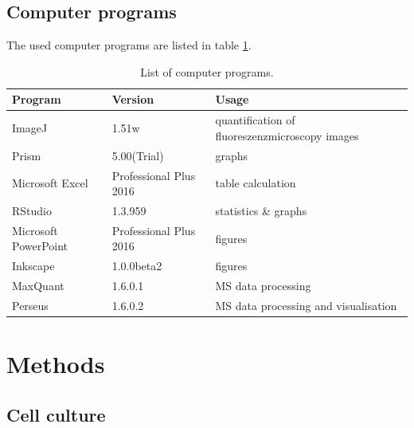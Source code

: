 \documentclass[a4paper,11pt,bibtotocnumbered]{article}
\begin{document}


\newpage
\subsection{Computer programs}

The used computer programs are listed in table \ref{Computerprogramme}.


\begin{table}[H]
\centering
{\captionsetup{format=hang}\caption[List of computer programs.]{List of computer programs.}\label{Computerprogramme}}
\renewcommand{\arraystretch}{1}
\begin{tabularx}{\textwidth}{p{4cm}p{3cm}X}
\toprule
Program&Version&Usage\\
\midrule
\midrule
ImageJ&1.51w&quantification of fluoreszenzmicroscopy images\\
\midrule
Prism&5.00(Trial)&graphs\\
\midrule
Microsoft Excel &Professional Plus 2016& table calculation\\
\midrule
RStudio &1.3.959& statistics \& graphs\\
\midrule
Microsoft PowerPoint&Professional Plus 2016&figures\\
\midrule
Inkscape&1.0.0beta2&figures\\
\midrule
MaxQuant&1.6.0.1  &MS data processing\\
\midrule
Perseus&1.6.0.2 &MS data processing and visualisation\\
\bottomrule
\end{tabularx}
\end{table}



\newpage
\section{Methods}

\subsection{Cell culture}
\end{document}
